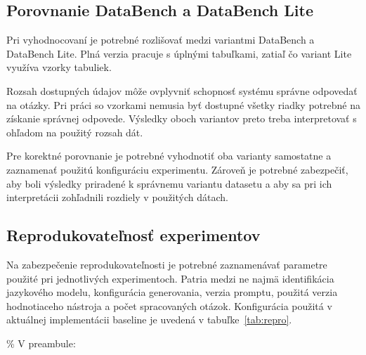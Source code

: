 \subsection{Porovnanie DataBench a DataBench Lite}

Pri vyhodnocovaní je potrebné rozlišovať medzi variantmi DataBench a DataBench Lite. Plná verzia pracuje s úplnými tabuľkami, zatiaľ čo variant Lite využíva vzorky tabuliek.

Rozsah dostupných údajov môže ovplyvniť schopnosť systému správne odpovedať na otázky. Pri práci so vzorkami nemusia byť dostupné všetky riadky potrebné na získanie správnej odpovede. Výsledky oboch variantov preto treba interpretovať s ohľadom na použitý rozsah dát.

Pre korektné porovnanie je potrebné vyhodnotiť oba varianty samostatne a zaznamenať použitú konfiguráciu experimentu. Zároveň je potrebné zabezpečiť, aby boli výsledky priradené k správnemu variantu datasetu a aby sa pri ich interpretácii zohľadnili rozdiely v použitých dátach.

\subsection{Reprodukovateľnosť experimentov}

Na zabezpečenie reprodukovateľnosti je potrebné zaznamenávať parametre použité pri jednotlivých experimentoch. Patria medzi ne najmä identifikácia jazykového modelu, konfigurácia generovania, verzia promptu, použitá verzia hodnotiaceho nástroja a počet spracovaných otázok. Konfigurácia použitá v aktuálnej implementácii baseline je uvedená v tabuľke~\ref{tab:repro}.

\% V preambule:

